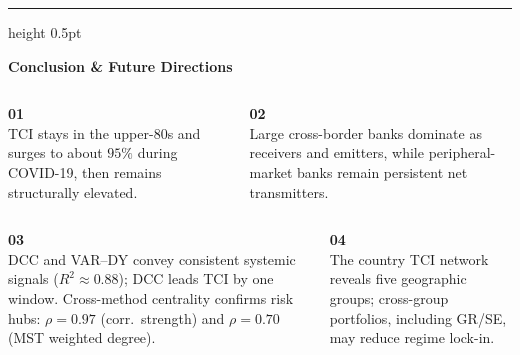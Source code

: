 \documentclass[aspectratio=169,10pt]{beamer}
\begin{document}
{
\begin{frame}[plain]
\vspace{0.10cm}
{\color{Accent}\hrule height 0.5pt}
\vspace{0.08cm}
{\color{white}\large\bfseries Conclusion \& Future Directions}
\vspace{0.10cm}

\begin{columns}[T,onlytextwidth]
  \begin{tcolorbox}[enhanced,colback=DarkBlue,colframe=DarkBlue,
    coltext=white,boxrule=0pt,arc=3pt,
    left=5pt,right=5pt,top=3pt,bottom=3pt]
    {\color{Gold}\Large\bfseries 01}\\[2pt]
    {\scriptsize TCI stays in the upper-80s and surges to about $95\%$ during COVID-19, then remains structurally elevated.}
  \end{tcolorbox}
  \begin{tcolorbox}[enhanced,colback=DarkBlue,colframe=DarkBlue,
    coltext=white,boxrule=0pt,arc=3pt,
    left=5pt,right=5pt,top=3pt,bottom=3pt]
    {\color{Gold}\Large\bfseries 02}\\[2pt]
    {\scriptsize Large cross-border banks dominate as receivers and emitters, while peripheral-market banks remain persistent net transmitters.}
  \end{tcolorbox}
\end{columns}

\vspace{3pt}

\begin{columns}[T,onlytextwidth]
  \begin{tcolorbox}[enhanced,colback=DarkBlue,colframe=DarkBlue,
    coltext=white,boxrule=0pt,arc=3pt,
    left=5pt,right=5pt,top=3pt,bottom=3pt]
    {\color{Gold}\Large\bfseries 03}\\[2pt]
    {\scriptsize DCC and VAR--DY convey consistent systemic signals ($R^2\approx0.88$); DCC leads TCI by one window. Cross-method centrality confirms risk hubs: $\rho=0.97$ (corr.\ strength) and $\rho=0.70$ (MST weighted degree).}
  \end{tcolorbox}
  \begin{tcolorbox}[enhanced,colback=DarkBlue,colframe=DarkBlue,
    coltext=white,boxrule=0pt,arc=3pt,
    left=5pt,right=5pt,top=3pt,bottom=3pt]
    {\color{Gold}\Large\bfseries 04}\\[2pt]
    {\scriptsize The country TCI network reveals five geographic groups; cross-group portfolios, including GR/SE, may reduce regime lock-in.}
  \end{tcolorbox}
\end{columns}


\end{frame}}
\end{document}
